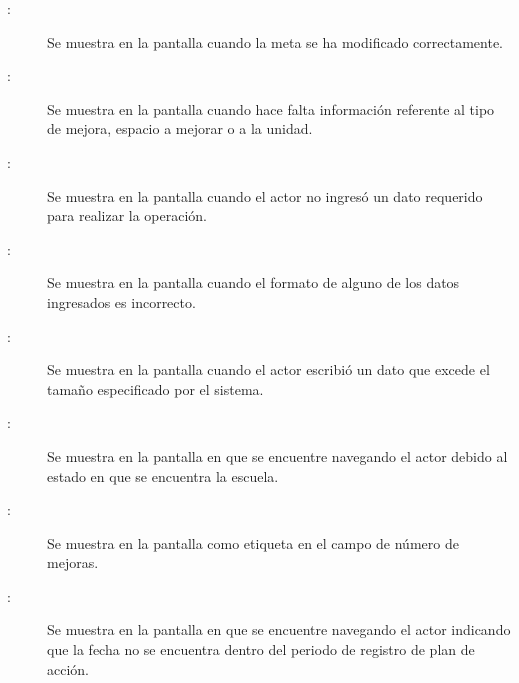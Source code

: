 \begin{description}
	\item[:] Se muestra en la pantalla  cuando la meta se ha modificado correctamente.
	\item[:] Se muestra en la pantalla  cuando hace falta información referente al tipo de mejora, espacio a mejorar o a la unidad.
	\item[:] Se muestra en la pantalla  cuando el actor no ingresó un dato requerido para realizar la operación.
	\item[:] Se muestra en la pantalla  cuando el formato de alguno de los datos ingresados es incorrecto.
	\item[:] Se muestra en la pantalla  cuando el actor escribió un dato que excede el tamaño especificado por el sistema.
		\item[:] Se muestra en la pantalla en que se encuentre navegando el actor debido al estado en que se encuentra la escuela.	
	\item[:] Se muestra en la pantalla  como etiqueta en el campo de número de mejoras.
	\item[:] Se muestra en la pantalla en que se encuentre navegando el actor indicando que la fecha no se encuentra dentro del periodo de registro de plan de acción.
\end{description}
